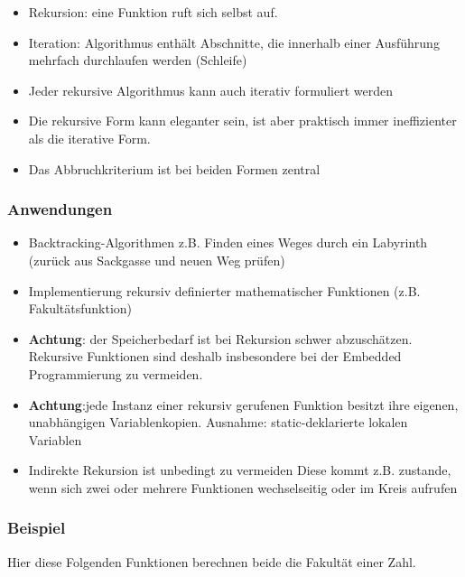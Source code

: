 \begin{itemize}[itemsep=1pt, parsep=0pt]
    \item Rekursion: eine Funktion ruft sich selbst auf.
    \item Iteration: Algorithmus enthält Abschnitte, die innerhalb einer Ausführung mehrfach durchlaufen werden (Schleife)
    \item Jeder rekursive Algorithmus kann auch iterativ formuliert werden
    \item Die rekursive Form kann eleganter sein, ist aber praktisch immer ineffizienter als die iterative Form.
    \item Das Abbruchkriterium ist bei beiden Formen zentral
\end{itemize}

\subsubsection{Anwendungen}
\begin{itemize}[itemsep=1pt, parsep=0pt]

    \item Backtracking-Algorithmen z.B. Finden eines Weges durch ein Labyrinth (zurück aus Sackgasse und neuen Weg prüfen)
    \item Implementierung rekursiv definierter mathematischer Funktionen (z.B. Fakultätsfunktion)
    \item \textbf{Achtung}: der Speicherbedarf ist bei Rekursion schwer abzuschätzen. Rekursive Funktionen sind deshalb insbesondere bei der Embedded Programmierung zu vermeiden.
    \item \textbf{Achtung}:jede Instanz einer rekursiv gerufenen Funktion besitzt ihre eigenen, unabhängigen Variablenkopien. Ausnahme: static-deklarierte lokalen Variablen
    \item Indirekte Rekursion ist unbedingt zu vermeiden Diese kommt z.B. zustande, wenn sich zwei oder mehrere Funktionen wechselseitig oder im Kreis aufrufen
\end{itemize}

\vfill\null
\columnbreak

\subsubsection{Beispiel}

Hier diese Folgenden Funktionen berechnen beide die Fakultät einer Zahl.\\

